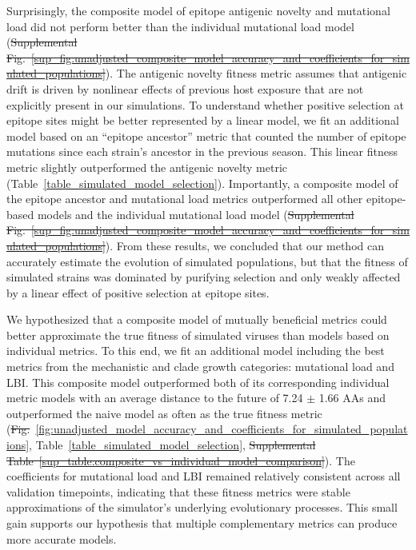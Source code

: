 \documentclass[9pt,lineno]{elife} %
\providecommand{\DIFadd}[1]{{\protect\color{blue}\uwave{#1}}} %
\providecommand{\DIFdel}[1]{{\protect\color{red}\sout{#1}}}                      %
\providecommand{\DIFaddbegin}{} %
\providecommand{\DIFaddend}{} %
\providecommand{\DIFdelbegin}{} %
\providecommand{\DIFdelend}{} %
\providecommand{\DIFaddtex}[1]{{\protect\color{blue}\uwave{#1}}} %
\providecommand{\DIFdeltex}[1]{{\protect\color{red}\sout{#1}}}                      %
\providecommand{\DIFaddbegin}{} %
\providecommand{\DIFaddend}{} %
\providecommand{\DIFdelbegin}{} %
\providecommand{\DIFdelend}{} %
\providecommand{\DIFadd}[1]{\texorpdfstring{\DIFaddtex{#1}}{#1}} %
\providecommand{\DIFdel}[1]{\texorpdfstring{\DIFdeltex{#1}}{}} %
\newcommand{\DIFscaledelfig}{0.5}
\newlength{\DIFdelgraphicswidth} %
\newlength{\DIFdelgraphicsheight} %
\newcommand{\DIFaddincludegraphics}[2][]{{\color{blue}\fbox{\DIFOincludegraphics[#1]{#2}}}} %
\newcommand{\DIFdelincludegraphics}[2][]{%
\sbox{\DIFdelgraphicsbox}{\DIFOincludegraphics[#1]{#2}}%
\settoboxwidth{\DIFdelgraphicswidth}{\DIFdelgraphicsbox} %
\settoboxtotalheight{\DIFdelgraphicsheight}{\DIFdelgraphicsbox} %
\scalebox{\DIFscaledelfig}{%
\parbox[b]{\DIFdelgraphicswidth}{\usebox{\DIFdelgraphicsbox}\\[-\baselineskip] \rule{\DIFdelgraphicswidth}{0em}}\llap{\resizebox{\DIFdelgraphicswidth}{\DIFdelgraphicsheight}{%
\setlength{\unitlength}{\DIFdelgraphicswidth}%
\begin{picture}(1,1)%
\thicklines\linethickness{2pt} %
{\color[rgb]{1,0,0}\put(0,0){\framebox(1,1){}}}%
{\color[rgb]{1,0,0}\put(0,0){\line( 1,1){1}}}%
{\color[rgb]{1,0,0}\put(0,1){\line(1,-1){1}}}%
\end{picture}%
}\hspace*{3pt}}} %
} %
\DeclareRobustCommand{\DIFaddbegin}{\DIFOaddbegin \let\includegraphics\DIFaddincludegraphics} %
\DeclareRobustCommand{\DIFaddend}{\DIFOaddend \let\includegraphics\DIFOincludegraphics} %
\DeclareRobustCommand{\DIFdelbegin}{\DIFOdelbegin \let\includegraphics\DIFdelincludegraphics} %
\DeclareRobustCommand{\DIFdelend}{\DIFOaddend \let\includegraphics\DIFOincludegraphics} %
\begin{document}
Surprisingly, the composite model of epitope antigenic novelty and mutational load did not perform better than the individual mutational load model (\DIFdelbegin \DIFdel{Supplemental Fig.~\ref{sup_fig:unadjusted_composite_model_accuracy_and_coefficients_for_simulated_populations}}\DIFdelend \DIFaddbegin \DIFadd{Figure~\ref{fig:unadjusted_model_accuracy_and_coefficients_for_simulated_populations}-Figure supplement~\ref{figsupp:unadjusted_composite_model_accuracy_and_coefficients_for_simulated_populations}}\DIFaddend ).
The antigenic novelty fitness metric assumes that antigenic drift is driven by nonlinear effects of previous host exposure \DIFdelbegin %
\DIFdelend \DIFaddbegin \citep{Luksza:2014hj} \DIFaddend that are not explicitly present in our simulations.
To understand whether positive selection at epitope sites might be better represented by a linear model, we fit an additional model based on an ``epitope ancestor'' metric that counted the number of epitope mutations since each strain's ancestor in the previous season.
This linear fitness metric slightly outperformed the antigenic novelty metric (Table~\ref{table_simulated_model_selection}).
Importantly, a composite model of the epitope ancestor and mutational load metrics outperformed all other epitope-based models and the individual mutational load model (\DIFdelbegin \DIFdel{Supplemental Fig.~\ref{sup_fig:unadjusted_composite_model_accuracy_and_coefficients_for_simulated_populations}}\DIFdelend \DIFaddbegin \DIFadd{Figure~\ref{fig:unadjusted_model_accuracy_and_coefficients_for_simulated_populations}-Figure supplement~\ref{figsupp:unadjusted_composite_model_accuracy_and_coefficients_for_simulated_populations}}\DIFaddend ).
From these results, we concluded that our method can accurately estimate the evolution of simulated populations, but that the fitness of simulated strains was dominated by purifying selection and only weakly affected by a linear effect of positive selection at epitope sites.

We hypothesized that a composite model of mutually beneficial metrics could better approximate the true fitness of simulated viruses than models based on individual metrics.
To this end, we fit an additional model including the best metrics from the mechanistic and clade growth categories: mutational load and LBI.
This composite model outperformed both of its corresponding individual metric models with an average distance to the future of 7.24 $\pm$ 1.66 AAs and outperformed the naive model as often as the true fitness metric (\DIFdelbegin \DIFdel{Fig.}\DIFdelend \DIFaddbegin \DIFadd{Figure}\DIFaddend ~\ref{fig:unadjusted_model_accuracy_and_coefficients_for_simulated_populations}, Table~\ref{table_simulated_model_selection}, \DIFdelbegin \DIFdel{Supplemental Table~\ref{sup_table:composite_vs_individual_model_comparison}}\DIFdelend \DIFaddbegin \DIFadd{Table~\ref{table:composite_vs_individual_model_comparison}}\DIFaddend ).
The coefficients for mutational load and LBI remained relatively consistent across all validation timepoints, indicating that these fitness metrics were stable approximations of the simulator's underlying evolutionary processes.
This small gain supports our hypothesis that multiple complementary metrics can produce more accurate models.
\end{document}
